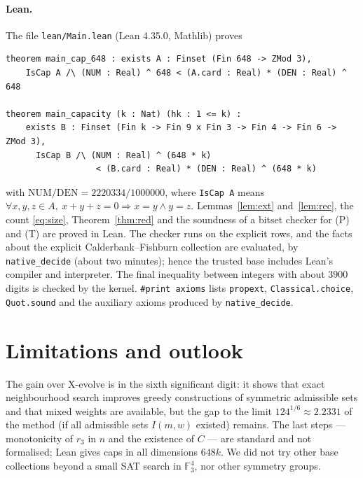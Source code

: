 \documentclass[11pt]{article}
\numberwithin{equation}{section}
\theoremstyle{definition}
\theoremstyle{remark}
\newcommand{\F}{\mathbb F}
\newcommand{\NLNUM}{2220334}
\newcommand{\NLDEN}{1000000}
\begin{document}
\paragraph{Lean.}  The file \texttt{lean/Main.lean} (Lean 4.35.0, Mathlib) proves
\begin{verbatim}
theorem main_cap_648 : exists A : Finset (Fin 648 -> ZMod 3),
    IsCap A /\ (NUM : Real) ^ 648 < (A.card : Real) * (DEN : Real) ^ 648

theorem main_capacity (k : Nat) (hk : 1 <= k) :
    exists B : Finset (Fin k -> Fin 9 x Fin 3 -> Fin 4 -> Fin 6 -> ZMod 3),
      IsCap B /\ (NUM : Real) ^ (648 * k)
                  < (B.card : Real) * (DEN : Real) ^ (648 * k)
\end{verbatim}
with $\mathrm{NUM}/\mathrm{DEN}=\NLNUM/\NLDEN$, where \texttt{IsCap A} means
$\forall x,y,z\in A,\ x+y+z=0\Rightarrow x=y\wedge y=z$.  Lemmas~\ref{lem:ext} and~\ref{lem:rec}, the
count \eqref{eq:size}, Theorem~\ref{thm:red} and the soundness of a bitset checker for (P) and (T) are
proved in Lean.  The checker runs on the explicit rows, and the facts about the explicit
Calderbank--Fishburn collection are evaluated, by \texttt{native\_decide} (about two minutes); hence the
trusted base includes Lean's compiler and interpreter.  The final inequality between integers with about
$3900$ digits is checked by the kernel.  \texttt{\#print axioms} lists \texttt{propext},
\texttt{Classical.choice}, \texttt{Quot.sound} and the auxiliary axioms produced by \texttt{native\_decide}.

\section{Limitations and outlook}
The gain over X-evolve is in the sixth significant digit: it shows that exact neighbourhood search
improves greedy constructions of symmetric admissible sets and that mixed weights are available, but the
gap to the limit $124^{1/6}\approx2.2331$ of the method \cite{Tyrrell} (if all admissible sets
$I(m,w)$ existed) remains.  The last steps --- monotonicity of $r_3$ in $n$ and the existence of $C$ ---
are standard and not formalised; Lean gives caps in all dimensions $648k$.  We did not try other base
collections beyond a small SAT search in $\F_3^4$, nor other symmetry groups.
\end{document}
